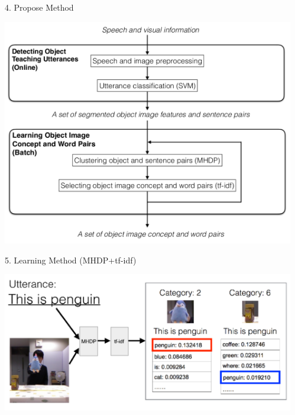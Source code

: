 \documentclass[final,hyperref={pdfpagelabels=false}]{beamer}
\newcommand{\shrink}{-15pt}
\begin{document}
\begin{frame}[t]
\begin{columns}[t]
  \begin{column}{.02\textwidth}\end{column} %

  \begin{column}{.3\textwidth} %
    \vspace{\shrink}
    \begin{block}{4. Propose Method}
      \begin{center}
        \includegraphics[width=0.9\columnwidth]{./fig/propose_method.pdf}
      \end{center}
    \end{block}

    \begin{block}{5. Learning Method (MHDP+tf-idf)}
      \begin{center}
        \includegraphics[width=0.9\columnwidth]{./fig/learning_method.pdf}
      \end{center}
    \end{block}


\end{column}
\end{columns}
\end{frame}
\end{document}
